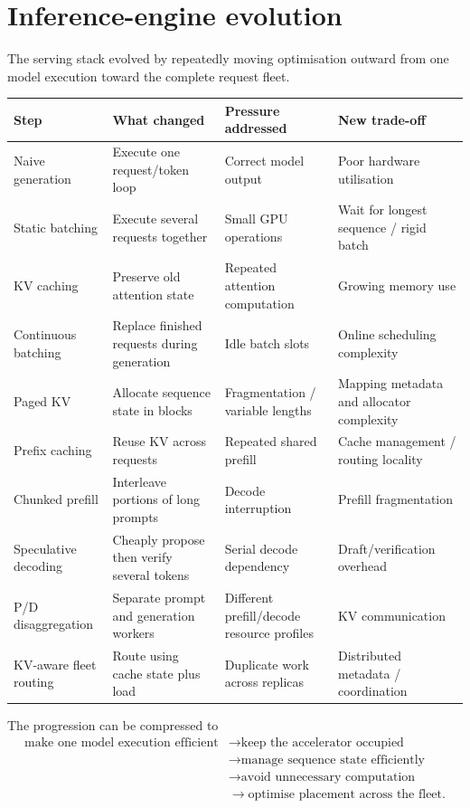 \section{Inference-engine evolution}
\label{sec:inference-engine-evolution}
The serving stack evolved by repeatedly moving optimisation outward from one model execution toward the complete request fleet.

\begin{center}
\small
\begin{tabularx}{.98\linewidth}{@{}L{.18\linewidth}L{.23\linewidth}YY@{}}
\toprule
\textbf{Step} & \textbf{What changed} & \textbf{Pressure addressed} & \textbf{New trade-off} \\
\midrule
Naive generation
& Execute one request/token loop
& Correct model output
& Poor hardware utilisation \\
Static batching
& Execute several requests together
& Small GPU operations
& Wait for longest sequence / rigid batch \\
KV caching
& Preserve old attention state
& Repeated attention computation
& Growing memory use \\
Continuous batching
& Replace finished requests during generation
& Idle batch slots
& Online scheduling complexity \\
Paged KV
& Allocate sequence state in blocks
& Fragmentation / variable lengths
& Mapping metadata and allocator complexity \\
Prefix caching
& Reuse KV across requests
& Repeated shared prefill
& Cache management / routing locality \\
Chunked prefill
& Interleave portions of long prompts
& Decode interruption
& Prefill fragmentation \\
Speculative decoding
& Cheaply propose then verify several tokens
& Serial decode dependency
& Draft/verification overhead \\
P/D disaggregation
& Separate prompt and generation workers
& Different prefill/decode resource profiles
& KV communication \\
KV-aware fleet routing
& Route using cache state plus load
& Duplicate work across replicas
& Distributed metadata / coordination \\
\bottomrule
\end{tabularx}
\end{center}

The progression can be compressed to
\[
\boxed{
\begin{aligned}
\text{make one model execution efficient}
&\rightarrow
\text{keep the accelerator occupied}\\
&\rightarrow
\text{manage sequence state efficiently}\\
&\rightarrow
\text{avoid unnecessary computation}\\
&\rightarrow
\text{optimise placement across the fleet}.
\end{aligned}
}
\]

